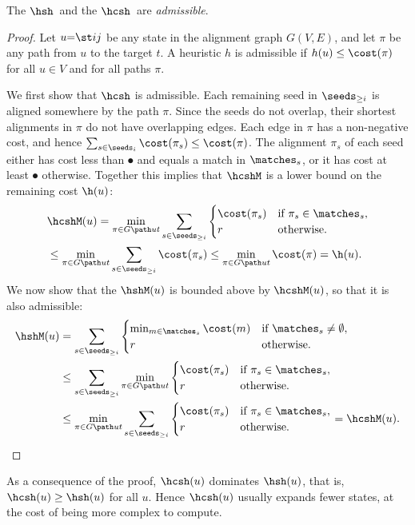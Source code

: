 \begin{thm}\label{GLOBALthm:admissible}
  The \sh $\hsh$\, and the \csh $\hcsh$\, are \emph{admissible}.
\end{thm}
\begin{proof}
  Let $u{=}\st ij$ be any state in the alignment graph $G(V,E)$, and let $\pi$ be any
  path from $u$ to the target $t$. A heuristic $h$ is admissible if $h(u) \leq
  \cost(\pi)$ for all $u\in V$ and for all paths $\pi$.

  We first show that $\hcsh$ is admissible. Each remaining seed in $\seeds_{\geq i}$
  is aligned somewhere by the path $\pi$. Since the seeds do not overlap, their
  shortest alignments in $\pi$ do not have overlapping edges. Each edge in
  $\pi$ has a non-negative cost, and hence $\sum_{s\in \seeds_i} \cost(\pi_s) \leq \cost(\pi)$.
  The alignment $\pi_s$ of each seed either has cost less than $\spot$ and
  equals a match in $\matches_s$, or it has cost at least $\spot$ otherwise. Together
  this implies that $\hcshM$ is a lower bound on the remaining cost $\h(u)$:
  \begin{equation}
    \begin{split}
    &\hcshM(u) = \min_{\pi \in G \path ut}  \sum_{s\in \seeds_{\geq i}}
    \begin{cases}
    \cost(\pi_s) &\text{if $\pi_s \in \matches_s$}, \\
    r &\text{otherwise.}
    \end{cases}\\
    &\leq \min_{\pi \in G \path ut}  \sum_{s\in \seeds_{\geq i}} \cost(\pi_s)
    \leq \min_{\pi \in G \path ut}  \cost(\pi) = \h(u).
    \end{split}
  \end{equation}
  We now show that the \sh $\hshM(u)$ is bounded above by $\hcshM(u)$, so that
  it is also admissible:
  \begin{align*}
    \hshM(u) &= \sum_{s\in \seeds_{\geq i}}
      \begin{cases}
      \min_{m\in \matches_s}\cost(m) &\text{if $\matches_s\neq \emptyset$}, \\
      r &\text{otherwise.}
      \end{cases}\\
    &\leq  \sum_{s\in \seeds_{\geq i}} \min_{\pi \in G \path ut}
      \begin{cases}
      \cost(\pi_s) &\text{if $\pi_s \in \matches_s$}, \\
      r &\text{otherwise.}
      \end{cases}\\
    &\leq \min_{\pi \in G \path ut}  \sum_{s\in \seeds_{\geq i}}
      \begin{cases}
      \cost(\pi_s) &\text{if $\pi_s \in \matches_s$}, \\
      r &\text{otherwise.}
      \end{cases} 
    = \hcshM(u).
  \end{align*}
\end{proof}

As a consequence of the proof,
$\hcsh(u)$ dominates $\hsh(u)$, that is, ${\hcsh(u) \geq \hsh(u)}$ for all $u$.
Hence $\hcsh(u)$ usually expands fewer states, at the cost of
being more complex to compute.

